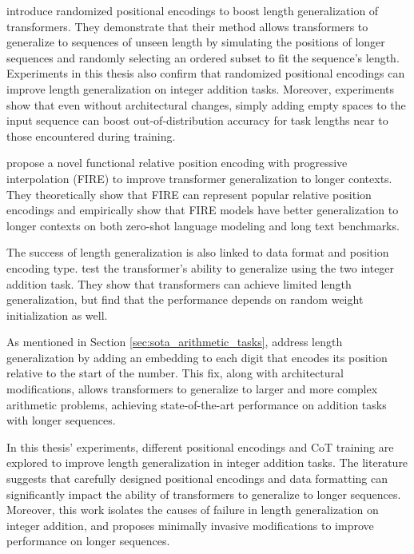\cite{ruoss_randomized_2023} introduce randomized positional encodings to boost length generalization of transformers. They demonstrate that their method allows transformers to generalize to sequences of unseen length by simulating the positions of longer sequences and randomly selecting an ordered subset to fit the sequence's length. Experiments in this thesis also confirm that randomized positional encodings can improve length generalization on integer addition tasks. Moreover, experiments show that even without architectural changes, simply adding empty spaces to the input sequence can boost out-of-distribution accuracy for task lengths near to those encountered during training.

\cite{li_functional_2024} propose a novel functional relative position encoding with progressive interpolation (FIRE) to improve transformer generalization to longer contexts. They theoretically show that FIRE can represent popular relative position encodings and empirically show that FIRE models have better generalization to longer contexts on both zero-shot language modeling and long text benchmarks.

The success of length generalization is also linked to data format and position encoding type. \cite{zhou_transformers_2024} test the transformer's ability to generalize using the two integer addition task. They show that transformers can achieve limited length generalization, but find that the performance depends on random weight initialization as well.

As mentioned in Section \ref{sec:sota_arithmetic_tasks}, \cite{mcleish_transformers_2024} address length generalization by adding an embedding to each digit that encodes its position relative to the start of the number. This fix, along with architectural modifications, allows transformers to generalize to larger and more complex arithmetic problems, achieving state-of-the-art performance on addition tasks with longer sequences.

In this thesis' experiments, different positional encodings and CoT training are explored to improve length generalization in integer addition tasks. The literature suggests that carefully designed positional encodings and data formatting can significantly impact the ability of transformers to generalize to longer sequences. Moreover, this work isolates the causes of failure in length generalization on integer addition, and proposes minimally invasive modifications to improve performance on longer sequences.